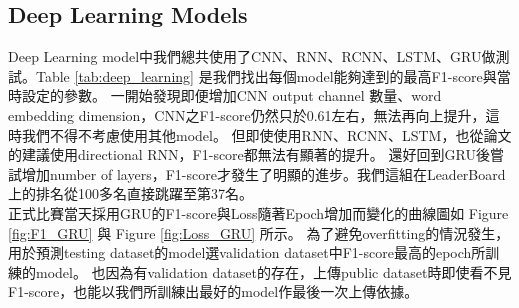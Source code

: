 \documentclass[8pt,a4paper]{article}
\begin{document}
\subsection*{Deep Learning Models} 

Deep Learning model中我們總共使用了CNN、RNN、RCNN、LSTM、GRU做測試。Table \ref{tab:deep_learning} 是我們找出每個model能夠達到的最高F1-score與當時設定的參數。
一開始發現即便增加CNN output channel 數量、word embedding dimension，CNN之F1-score仍然只於0.61左右，無法再向上提升，這時我們不得不考慮使用其他model。
但即使使用RNN、RCNN、LSTM，也從論文的建議使用directional RNN，F1-score都無法有顯著的提升。
還好回到GRU後嘗試增加number of layers，F1-score才發生了明顯的進步。我們這組在LeaderBoard上的排名從100多名直接跳躍至第37名。\\

正式比賽當天採用GRU的F1-score與Loss隨著Epoch增加而變化的曲線圖如 Figure \ref{fig:F1_GRU} 與 Figure \ref{fig:Loss_GRU} 所示。
為了避免overfitting的情況發生，用於預測testing dataset的model選validation dataset中F1-score最高的epoch所訓練的model。
也因為有validation dataset的存在，上傳public dataset時即使看不見F1-score，也能以我們所訓練出最好的model作最後一次上傳依據。\\
\end{document}
